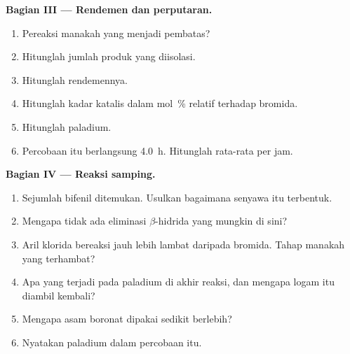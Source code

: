 \begin{problem}
\medskip
\noindent\textbf{Bagian III --- Rendemen dan perputaran.}
\begin{enumerate}[resume]
  \item Pereaksi manakah yang menjadi pembatas?
  \item Hitunglah jumlah produk yang diisolasi.
  \item Hitunglah rendemennya.
  \item Hitunglah kadar katalis dalam mol~\% relatif terhadap bromida.
  \item Hitunglah  paladium.
  \item Percobaan itu berlangsung \qty{4.0}{h}. Hitunglah 
        rata-rata per jam.
\end{enumerate}

\medskip
\noindent\textbf{Bagian IV --- Reaksi samping.}
\begin{enumerate}[resume]
  \item Sejumlah bifenil  ditemukan. Usulkan bagaimana senyawa itu terbentuk.
  \item Mengapa tidak ada eliminasi $\beta$-hidrida yang mungkin di sini?
  \item Aril klorida bereaksi jauh lebih lambat daripada bromida. Tahap
        manakah yang terhambat?
  \item Apa yang terjadi pada paladium di akhir reaksi, dan mengapa logam itu
        diambil kembali?
  \item Mengapa asam boronat dipakai sedikit berlebih?
  \item Nyatakan  paladium dalam percobaan itu.
\end{enumerate}
\end{problem}

